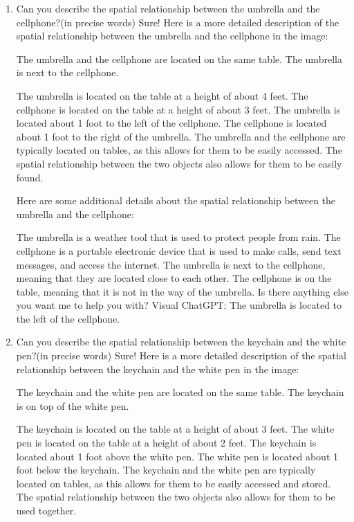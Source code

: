 \begin{enumerate}
    \item Can you describe the spatial relationship between the umbrella and the cellphone?(in precise words)
    \subitem 
    Sure! Here is a more detailed description of the spatial relationship between the umbrella and the cellphone in the image:
    
    The umbrella and the cellphone are located on the same table. The umbrella is next to the cellphone.
    
    The umbrella is located on the table at a height of about 4 feet.
    The cellphone is located on the table at a height of about 3 feet.
    The umbrella is located about 1 foot to the left of the cellphone.
    The cellphone is located about 1 foot to the right of the umbrella.
    The umbrella and the cellphone are typically located on tables, as this allows for them to be easily accessed. The spatial relationship between the two objects also allows for them to be easily found.
    
    Here are some additional details about the spatial relationship between the umbrella and the cellphone:
    
    The umbrella is a weather tool that is used to protect people from rain.
    The cellphone is a portable electronic device that is used to make calls, send text messages, and access the internet.
    The umbrella is next to the cellphone, meaning that they are located close to each other.
    The cellphone is on the table, meaning that it is not in the way of the umbrella.
    Is there anything else you want me to help you with?
    \subitem Visual ChatGPT: The umbrella is located to the left of the cellphone.
    \item Can you describe the spatial relationship between the keychain and the white pen?(in precise words)
    \subitem 
    Sure! Here is a more detailed description of the spatial relationship between the keychain and the white pen in the image:
    
    The keychain and the white pen are located on the same table. The keychain is on top of the white pen.
    
    The keychain is located on the table at a height of about 3 feet.
    The white pen is located on the table at a height of about 2 feet.
    The keychain is located about 1 foot above the white pen.
    The white pen is located about 1 foot below the keychain.
    The keychain and the white pen are typically located on tables, as this allows for them to be easily accessed and stored. The spatial relationship between the two objects also allows for them to be used together.
    

\end{enumerate}
